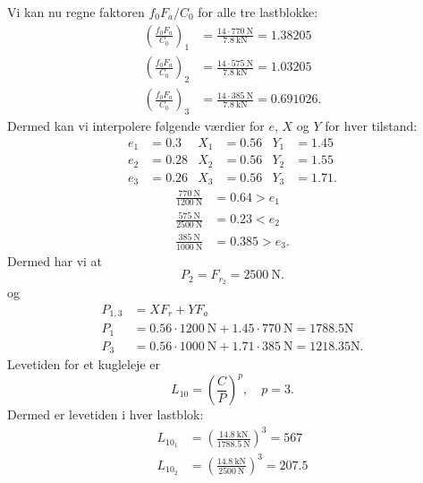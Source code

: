 \begin{derivation}
    Vi kan nu regne faktoren $f_0 F_a / C_0$ for alle tre lastblokke:
    \begin{align*}
      \left( \frac{f_0 F_a}{C_0} \right)_{1} &=  \frac{14 \cdot \qty{770}{\N}}{\qty{7,8}{\kN} }  = 1.38205\\
      \left( \frac{f_0 F_a}{C_0} \right)_{2} &=  \frac{14 \cdot \qty{575}{\N}}{\qty{7,8}{\kN} }  = 1.03205 \\
      \left( \frac{f_0 F_a}{C_0} \right)_{3} &=  \frac{14 \cdot \qty{385}{\N}}{\qty{7,8}{\kN} }  = 0.691026
    .\end{align*}
    Dermed kan vi interpolere følgende værdier for $e$, $X$ og $Y$ for hver tilstand:
    \begin{align*}
      e_1 &= \num{0,3} & X_1 &= \num{0,56} & Y_1 &= \num{1,45}  \\
      e_2 &= \num{0,28} & X_2 &= \num{0,56} & Y_2 &= \num{1,55}  \\
      e_3 &= \num{0,26} & X_3 &= \num{0,56} & Y_3 &= \num{1,71} 
    .\end{align*}
    \begin{align*}
      \frac{\qty{770}{\N}}{\qty{1200}{\N}} &= \num{0,64} > e_1 \\
      \frac{\qty{575}{\N} }{\qty{2500}{\N} } &= \num{0,23} < e_2 \\
      \frac{\qty{385}{\N} }{\qty{1000}{\N} } &= \num{0,385} > e_3
    .\end{align*}
    Dermed har vi at
    \begin{equation*}
      P_2 = F_{r_2} = \qty{2500}{\N} 
    .\end{equation*}
    og
    \begin{align*}
      P_{1,3} &= X F_r + Y F_a \\
      P_1 &= \num{0,56} \cdot \qty{1200}{\N} + \num{1,45} \cdot \qty{770}{\N}   = 1788.5\text{N}\\
      P_3 &= \num{0,56} \cdot \qty{1000}{\N} + \num{1,71} \cdot \qty{385}{\N}   = 1218.35\text{N}
    .\end{align*}
    Levetiden for et kugleleje er
    \begin{equation*}
      L_{10} = \left( \frac{C}{P} \right)^{p}, \quad p = 3
    .\end{equation*}
    Dermed er levetiden i hver lastblok:
    \begin{align*}
      L_{10_1} &= \left( \frac{\qty{14,8}{\kN} }{\qty{1788,5}{\N} } \right)^{3} = \num{567}  \\
      L_{10_2} &= \left( \frac{\qty{14,8}{\kN} }{\qty{2500}{\N} } \right)^{3} = \num{207,5}  \\

\end{align*}
\end{derivation}
